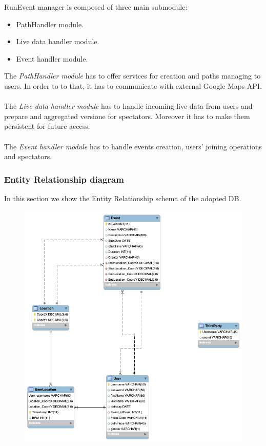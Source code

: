 \documentclass[DD.tex]{subfiles}
\begin{document}
RunEvent manager is composed of three main submodule: \begin{itemize}
	\item PathHandler module.
	\item Live data handler module.
	\item Event handler module.
\end{itemize}

The \textit{PathHandler module} has to offer services for creation and paths managing to users. In order to to that, it has to communicate with external Google Maps API.\\\\
The \textit{Live data handler module} has to handle incoming live data from users and prepare and aggregated versione for spectators. Moreover it has to make them persistent for future access.\\\\
The \textit{Event handler module} has to handle events creation, users' joining operations and spectators.





\newpage
\subsubsection{Entity Relationship diagram}
In this section we show the Entity Relationship schema of the adopted DB.
\begin{figure}[h!]
	\centering
	\includegraphics[height=12.00cm,keepaspectratio]{Figures/er-schema}
\end{figure}
\end{document}
